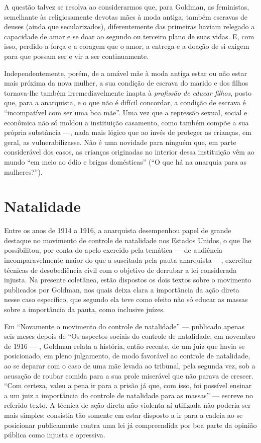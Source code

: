 A questão talvez se resolva ao considerarmos que, para Goldman, as feministas, semelhante às
religiosamente devotas mães à moda antiga, também escravas de deuses (ainda que secularizados), diferentemente das primeiras haviam relegado a capacidade de
amar e se doar ao segundo ou terceiro plano de suas vidas. E, com isso,
perdido a força e a coragem que o amor, a entrega e a
doação de si exigem para que possam ser e vir a ser continuamente.

Independentemente, porém, de a amável mãe à moda antiga estar ou não
estar mais próxima da nova mulher, a sua condição de escrava do marido e
dos filhos tornava-lhe também irremediavelmente inapta à \textit{profissão de
educar filhos}, posto que, para a anarquista, e o que não é difícil
concordar, a condição de escrava é ``incompatível com ser uma boa mãe''.
Uma vez que a repressão sexual, social e econômica não só moldou a
instituição casamento, como também compõe a sua própria substância ---,
nada mais lógico que ao invés de proteger as crianças, em geral, as
vulnerabilizasse. Não é uma novidade para ninguém que, em parte
considerável dos casos, as crianças originadas no interior dessa
instituição vêm ao mundo ``em meio ao ódio e brigas domésticas'' (``O
que há na anarquia para as mulheres?'').

\section{Natalidade}

Entre os anos de 1914 a 1916, a anarquista desempenhou papel de grande
destaque no movimento de controle de natalidade nos Estados Unidos, o
que lhe possibilitou, por conta do apelo exercido pela temática --- de
audiência incomparavelmente maior do que a suscitada pela pauta
anarquista ---, exercitar técnicas de desobediência civil com o objetivo
de derrubar a lei considerada injusta. Na presente coletânea, estão
dispostos os dois textos sobre o movimento publicados por Goldman, nos quais deixa clara a importância da ação
direta nesse caso específico, que segundo ela teve como efeito não só
educar as massas sobre a importância da pauta, como inclusive juízes. 

Em
``Novamente o movimento do controle de natalidade'' --- publicado apenas
seis meses depois de ``Os aspectos sociais do controle de natalidade, em
novembro de 1916 --- , Goldman relata a história, então recente, de um
juiz que havia se posicionado, em pleno julgamento, de modo favorável ao
controle de natalidade, ao se deparar com o caso de uma mãe levada ao
tribunal, pela segunda vez, sob a acusação de roubar comida para a sua
prole miserável que não parava de crescer. ``Com certeza, valeu a pena
ir para a prisão já que, com isso, foi possível ensinar a um juiz a
importância do controle de natalidade para as massas'' --- escreve no
referido texto. A técnica de ação direta não-violenta aí utilizada não
poderia ser mais simples: consistia tão somente em estar disposto a ir
para a cadeia ao se posicionar publicamente contra uma lei já
compreendida por boa parte da opinião pública como injusta e opressiva.

